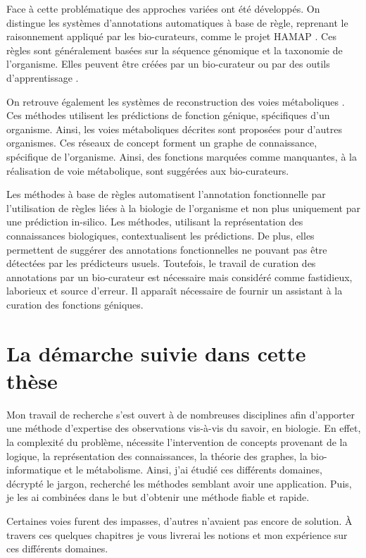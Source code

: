 \begin{refsegment}
Face à cette problématique des approches variées ont été développés. On distingue les systèmes d'annotations automatiques à base de règle, reprenant le raisonnement appliqué par les bio-curateurs, comme le projet HAMAP \cite{lima2009hamap}. Ces règles sont généralement basées sur la séquence génomique et la taxonomie de l'organisme. Elles peuvent être créées par un bio-curateur ou par des outils d'apprentissage \cite{uniprot2011ongoing}.

On retrouve également les systèmes de reconstruction des voies métaboliques \cite{karpe2011pathway}. Ces méthodes utilisent les prédictions de fonction génique, spécifiques d'un organisme. Ainsi, les voies métaboliques décrites sont proposées pour d'autres organismes. Ces réseaux de concept forment un graphe de connaissance, spécifique de l'organisme. Ainsi, des fonctions marquées comme manquantes, à la réalisation de voie métabolique, sont suggérées aux bio-curateurs.

Les méthodes à base de règles automatisent l'annotation fonctionnelle par l'utilisation de règles liées à la biologie de l'organisme et non plus uniquement par une prédiction in-silico. Les méthodes, utilisant la représentation des connaissances biologiques, contextualisent les prédictions. De plus, elles permettent de suggérer des annotations fonctionnelles ne pouvant pas être détectées par les prédicteurs usuels. Toutefois, le travail de curation des annotations par un bio-curateur est nécessaire mais considéré comme fastidieux, laborieux et source d'erreur. Il apparaît nécessaire de fournir un assistant à la curation des fonctions géniques.

\section*{La démarche suivie dans cette thèse}

Mon travail de recherche s'est ouvert à de nombreuses disciplines afin d'apporter une méthode d'expertise des observations vis-à-vis du savoir, en biologie. En effet, la complexité du problème, nécessite l'intervention de concepts provenant de la logique, la représentation des connaissances, la théorie des graphes, la bio-informatique et le métabolisme. Ainsi, j'ai étudié ces différents domaines, décrypté le jargon, recherché les méthodes semblant avoir une application. Puis, je les ai combinées dans le but d'obtenir une méthode fiable et rapide.

Certaines voies furent des impasses, d'autres n'avaient pas encore de solution. À travers ces quelques chapitres je vous livrerai les notions et mon expérience sur ces différents domaines.


\end{refsegment}
